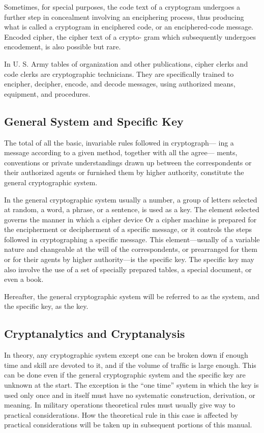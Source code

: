 \mypara Sometimes, for special purposes, the code text of a cryptogram
undergoes a further step in concealment involving an enciphering process,
thus producing what is called a cryptogram in enciphered code, or an
enciphered-code message. Encoded cipher, the cipher text of a crypto-
gram which subsequently undergoes encodement, is also possible but rare.

\mypara In U. S. Army tables of organization and other publications, cipher
clerks and code clerks are cryptographic technicians. They are speciﬁcally
trained to encipher, decipher, encode, and decode messages, using
authorized means, equipment, and procedures.

\subsection{General System and Speciﬁc Key}

\mypara The total of all the basic, invariable rules followed in cryptograph—
ing a message according to a given method, together with all the agree—
ments, conventions or private understandings drawn up between the
correspondents or their authorized agents or furnished them by higher
authority, constitute the general cryptographic system.

\mypara In the general cryptographic system usually a number, a group of
letters selected at random, a word, a phrase, or a sentence, is used as a
key. The element selected governs the manner in which a cipher device
Or a cipher machine is prepared for the encipherment or decipherment
of a speciﬁc message, or it controls the steps followed in cryptographing
a specific message. This element—usually of a variable nature and
changeable at the will of the correspondents, or prearranged for them or
for their agents by higher authority—is the speciﬁc key. The speciﬁc key
may also involve the use of a set of specially prepared tables, a special
document, or even a book.

\mypara Hereafter, the general cryptographic system will be referred to as
the system, and the speciﬁc key, as the key.

\subsection{Cryptanalytics and Cryptanalysis}

\mypara In theory, any cryptographic system except one can be broken down
if enough time and skill are devoted to it, and if the volume of trafﬁc is
large enough. This can be done even if the general cryptographic system
and the speciﬁc key are unknown at the start. The exception is the “one
time” system in which the key is used only once and in itself must have
no systematic construction, derivation, or meaning. In military operations
theoretical rules must usually give way to practical considerations. How
the theoretical rule in this case is affected by practical considerations
will be taken up in subsequent portions of this manual.


